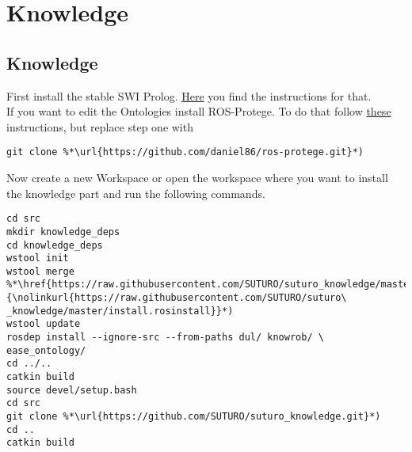\documentclass[main.tex]{subfiles}
\begin{document}
\section{Knowledge}
\subsection{Knowledge}
First install the stable SWI Prolog. \href{https://www.swi-prolog.org/build/PPA.html}{Here} you find the instructions for that.\\
If you want to edit the Ontologies install ROS-Protege. To do that follow \href{https://github.com/protegeproject/protege/wiki/Building-from-Source}{these} instructions, but replace step one with
\begin{lstlisting}
git clone %*\url{https://github.com/daniel86/ros-protege.git}*)
\end{lstlisting}

Now create a new Workspace or open the workspace where you want to install the knowledge part and run the following commands.
\begin{lstlisting}
cd src
mkdir knowledge_deps
cd knowledge_deps
wstool init
wstool merge %*\href{https://raw.githubusercontent.com/SUTURO/suturo_knowledge/master/install.rosinstall}{\nolinkurl{https://raw.githubusercontent.com/SUTURO/suturo\ _knowledge/master/install.rosinstall}}*)
wstool update
rosdep install --ignore-src --from-paths dul/ knowrob/ \ ease_ontology/
cd ../..
catkin build
source devel/setup.bash
cd src
git clone %*\url{https://github.com/SUTURO/suturo_knowledge.git}*)
cd ..
catkin build  
\end{lstlisting}
\end{document}
